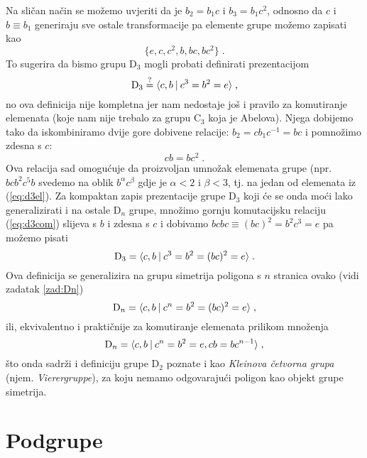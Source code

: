 Na sličan način se možemo uvjeriti da je $b_2 = b_1 c $
i $b_3 = b_1 c^2 $, odnosno da 
$c$ i $b\equiv b_1$ generiraju sve ostale transformacije pa
elemente grupe možemo zapisati kao
\begin{equation}
 \{e,c,c^2,b,bc,bc^2\} \;.
\label{eq:d3el}
\end{equation}
To sugerira da bismo grupu D$_3$ mogli probati definirati prezentacijom
\begin{equation}
    {\rm D}_3 \stackrel{?}{=} \langle c, b \: | \: c^3 = b^2 = e \rangle \;,
\label{eq:d3gp1}
\end{equation}
no ova definicija nije kompletna jer nam nedostaje još
i pravilo za komutiranje elemenata (koje nam nije trebalo
za grupu C$_3$ koja je Abelova). Njega dobijemo tako da
iskombiniramo dvije gore dobivene relacije: 
$b_2 = c b_1 c^{-1} = b c$ i pomnožimo zdesna s $c$:
\begin{equation}
c b = b c^2  \;.
\label{eq:d3com}
\end{equation}
Ova relacija sad omogućuje da proizvoljan umnožak elemenata
grupe (npr. $b c b^2 c^5 b$ svedemo na oblik $b^\alpha c^\beta$ gdje
je $\alpha<2$ i $\beta<3$, tj. na jedan od elemenata iz (\ref{eq:d3el}).
Za kompaktan zapis prezentacije grupe D$_3$ koji će se onda moći
lako generalizirati i na ostale D$_n$ grupe, množimo gornju
komutacijsku relaciju (\ref{eq:d3com}) slijeva s $b$ i zdesna s $c$
i dobivamo  $ bcbc \equiv (bc)^2 = b^2 c^3 = e$ pa možemo
pisati
\begin{equation}
 {\rm D}_3= \langle c,b \: | \: c^3 = b^2 = (bc)^2 = e \rangle \;.
\label{eq:d3gp}
\end{equation}
Ova definicija se generalizira na grupu simetrija poligona s $n$
stranica ovako (vidi zadatak \ref{zad:Dn})
\begin{equation}
 {\rm D}_n= \langle c,b \: | \: c^n = b^2 = (bc)^2 = e \rangle \;,
\label{eq:dngp}
\end{equation}
ili, ekvivalentno i praktičnije za komutiranje elemenata prilikom množenja
\begin{equation}
    {\rm D}_n= \langle c,b \: | \: c^n = b^2 = e, cb = b c^{n-1} \rangle \;,
\label{eq:dngpcom}
\end{equation}
što onda sadrži i definiciju grupe
D$_2$ poznate i kao
\emph{Kleinova četvorna grupa} (njem. \emph{Vierergruppe}), 
za koju nemamo odgovarajući poligon kao objekt grupe simetrija.


\section{Podgrupe}
\label{sec:podgrupe}

